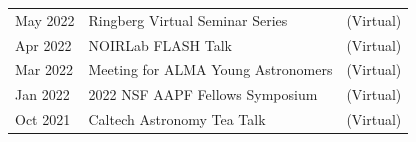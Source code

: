 \documentclass[11pt]{article}
\begin{document}
\begin{longtable}{p{} p{}p{}}
May 2022 & Ringberg Virtual Seminar Series & {\small (Virtual)}\\


Apr 2022 & NOIRLab FLASH Talk & {\small (Virtual)}\\

Mar 2022 & Meeting for ALMA Young Astronomers & {\small (Virtual)}\\

Jan  2022 & 2022 NSF AAPF Fellows Symposium  & {\small (Virtual)}\\

Oct 2021 & Caltech Astronomy Tea Talk & {\small (Virtual)} \\













\end{longtable}
\end{document}
